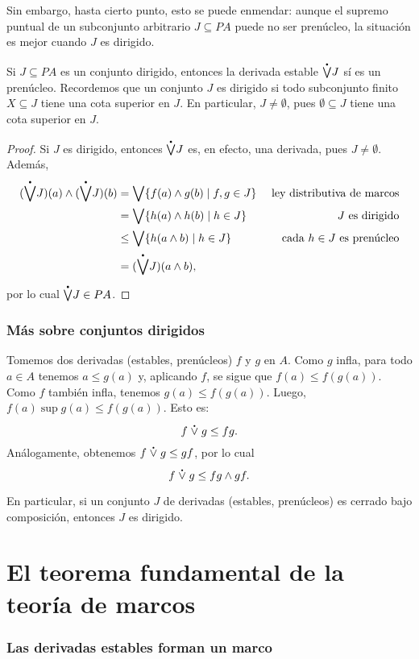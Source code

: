 Sin embargo, hasta cierto punto, esto se puede enmendar:
aunque el supremo puntual de un subconjunto arbitrario $J\subseteq PA$
puede no ser prenúcleo, la situación es mejor cuando $J$ es dirigido.
\begin{lemma}
    Si $J\subseteq PA$ es un conjunto dirigido,
    entonces la derivada estable $\pSup J$ sí es un prenúcleo.
    Recordemos que un conjunto $J$ es dirigido si todo subconjunto
    finito $X\subseteq J$ tiene una cota superior en $J$.
    En particular, $J\neq\emptyset$, pues $\emptyset\subseteq J$ tiene
    una cota superior en $J$.
\end{lemma}
\begin{proof}
    Si $J$ es dirigido, entonces $\pSup J$ es,
    en efecto, una derivada, pues $J\neq\emptyset$.
    Además,
    \begin{align*}
      (\pSup J)(a) \inf (\pSup J)(b)
      &= \Sup\{f(a)\inf g(b) \mid f,g\in J\}
        & \text{ ley distributiva de marcos} \\
      &= \Sup\{h(a) \inf h(b)  \mid h\in J \}
        & \text{ $J$ es dirigido} \\
      &\leq \Sup\{h(a \inf b)  \mid h\in J \}
        & \text{ cada $h\in J$ es prenúcleo} \\
      &= (\pSup J)(a\inf b),
    \end{align*}
    por lo cual $\pSup J\in PA$.
\end{proof}

\subsubsection{Más sobre conjuntos dirigidos}

Tomemos dos derivadas (estables, prenúcleos) $f$ y $g$ en $A$.
Como $g$ infla, para todo $a\in A$ tenemos $a\leq g(a)$ y,
aplicando $f$, se sigue que $f(a)\leq f(g(a))$.
Como $f$ también infla, tenemos $g(a)\leq f(g(a))$.
Luego, $f(a)\sup g(a) \leq f(g(a))$.
Esto es:
\[
  f\psup g \leq fg
.\]
Análogamente, obtenemos $f\psup g\leq gf$, por lo cual
\[
  f\psup g \leq fg\inf gf
.\]

En particular, si un conjunto $J$ de derivadas (estables,
prenúcleos) es cerrado bajo composición, entonces $J$ es dirigido.

\section{El teorema fundamental de la teoría de marcos}
\subsubsection{Las derivadas estables forman un marco}

